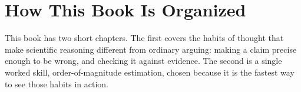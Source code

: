 \chapter*{How This Book Is Organized}

This book has two short chapters. The first covers the habits of
thought that make scientific reasoning different from ordinary
arguing: making a claim precise enough to be wrong, and checking it
against evidence. The second is a single worked skill, order-of-magnitude
estimation, chosen because it is the fastest way to see those habits
in action.

\begin{center}
\end{center}
